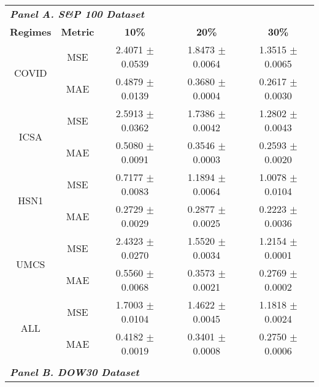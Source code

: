 \centering
{\fontsize{7pt}{11pt}\selectfont
\begin{tabular}{ccccc}
\hline
\multicolumn{5}{l}{\textit{\textbf{Panel A. S\&P 100 Dataset}}}                                                                              \\
\multicolumn{1}{l}{\textbf{Regimes}} & \multicolumn{1}{l}{\textbf{Metric}} & \textbf{10\%}       & \textbf{20\%}       & \textbf{30\%}       \\ \hline
\multirow{2}{*}{COVID}               & MSE                                 & 2.4071 $\pm$ 0.0539 & 1.8473 $\pm$ 0.0064 & 1.3515 $\pm$ 0.0065 \\
                                     & MAE                                 & 0.4879 $\pm$ 0.0139 & 0.3680 $\pm$ 0.0004 & 0.2617 $\pm$ 0.0030 \\ \hline
\multirow{2}{*}{ICSA}                & MSE                                 & 2.5913 $\pm$ 0.0362 & 1.7386 $\pm$ 0.0042 & 1.2802 $\pm$ 0.0043 \\
                                     & MAE                                 & 0.5080 $\pm$ 0.0091 & 0.3546 $\pm$ 0.0003 & 0.2593 $\pm$ 0.0020 \\ \hline
\multirow{2}{*}{HSN1}                & MSE                                 & 0.7177 $\pm$ 0.0083 & 1.1894 $\pm$ 0.0064 & 1.0078 $\pm$ 0.0104 \\
                                     & MAE                                 & 0.2729 $\pm$ 0.0029 & 0.2877 $\pm$ 0.0025 & 0.2223 $\pm$ 0.0036 \\ \hline
\multirow{2}{*}{UMCS}                & MSE                                 & 2.4323 $\pm$ 0.0270 & 1.5520 $\pm$ 0.0034 & 1.2154 $\pm$ 0.0001 \\
                                     & MAE                                 & 0.5560 $\pm$ 0.0068 & 0.3573 $\pm$ 0.0021 & 0.2769 $\pm$ 0.0002 \\ \hline
\multirow{2}{*}{ALL}                 & MSE                                 & 1.7003 $\pm$ 0.0104 & 1.4622 $\pm$ 0.0045 & 1.1818 $\pm$ 0.0024 \\
                                     & MAE                                 & 0.4182 $\pm$ 0.0019 & 0.3401 $\pm$ 0.0008 & 0.2750 $\pm$ 0.0006 \\ \hline
\multicolumn{5}{l}{}                                                                                                                         \\ \hline
\multicolumn{5}{l}{\textit{\textbf{Panel B. DOW30 Dataset}}}                                                                                 \\

\end{tabular}}
